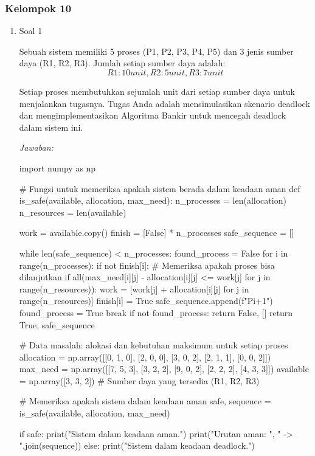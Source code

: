 \documentclass[12pt]{article}
\begin{document}
\subsubsection{Kelompok 10}
\begin{enumerate}
    \item Soal 1

Sebuah sistem memiliki 5 proses (P1, P2, P3, P4, P5) dan 3 jenis sumber daya (R1, R2, R3). Jumlah setiap sumber daya adalah:  
\[R1: 10 unit, R2: 5 unit, R3: 7 unit\]

Setiap proses membutuhkan sejumlah unit dari setiap sumber daya untuk menjalankan tugasnya. Tugas Anda adalah mensimulasikan skenario deadlock dan mengimplementasikan Algoritma Bankir untuk mencegah deadlock dalam sistem ini.

\textit{Jawaban:}
\begin{python}
import numpy as np

# Fungsi untuk memeriksa apakah sistem berada dalam keadaan aman
def is_safe(available, allocation, max_need):
    n_processes = len(allocation)
    n_resources = len(available)
    
    work = available.copy()
    finish = [False] * n_processes
    safe_sequence = []
    
    while len(safe_sequence) < n_processes:
        found_process = False
        for i in range(n_processes):
            if not finish[i]:
                # Memeriksa apakah proses bisa dilanjutkan
                if all(max_need[i][j] - allocation[i][j] <= work[j] for j in range(n_resources)):
                    work = [work[j] + allocation[i][j] for j in range(n_resources)]
                    finish[i] = True
                    safe_sequence.append(f"P{i+1}")
                    found_process = True
                    break
        if not found_process:
            return False, []
    return True, safe_sequence

# Data masalah: alokasi dan kebutuhan maksimum untuk setiap proses
allocation = np.array([[0, 1, 0], [2, 0, 0], [3, 0, 2], [2, 1, 1], [0, 0, 2]])
max_need = np.array([[7, 5, 3], [3, 2, 2], [9, 0, 2], [2, 2, 2], [4, 3, 3]])
available = np.array([3, 3, 2])  # Sumber daya yang tersedia (R1, R2, R3)

# Memeriksa apakah sistem dalam keadaan aman
safe, sequence = is_safe(available, allocation, max_need)

if safe:
    print("Sistem dalam keadaan aman.")
    print("Urutan aman: ", " -> ".join(sequence))
else:
    print("Sistem dalam keadaan deadlock.")
\end{python}


\end{enumerate}
\end{document}
